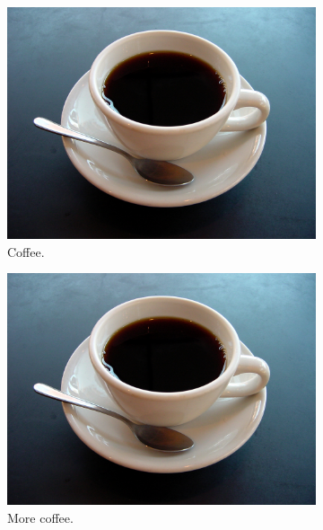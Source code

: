 \documentclass{article}
\begin{document}
\begin{figure}[h!]
    \centering
    \begin{subfigure}[b]{0.2\linewidth}
        \includegraphics[width=\linewidth]{coffee.jpg}
        \caption{Coffee.}
    \end{subfigure}
    \begin{subfigure}[b]{0.2\linewidth}
        \includegraphics[width=\linewidth]{coffee.jpg}
        \caption{More coffee.}
    \end{subfigure}
    \begin{subfigure}[b]{0.2\linewidth}

\end{subfigure}
\end{figure}
\end{document}
